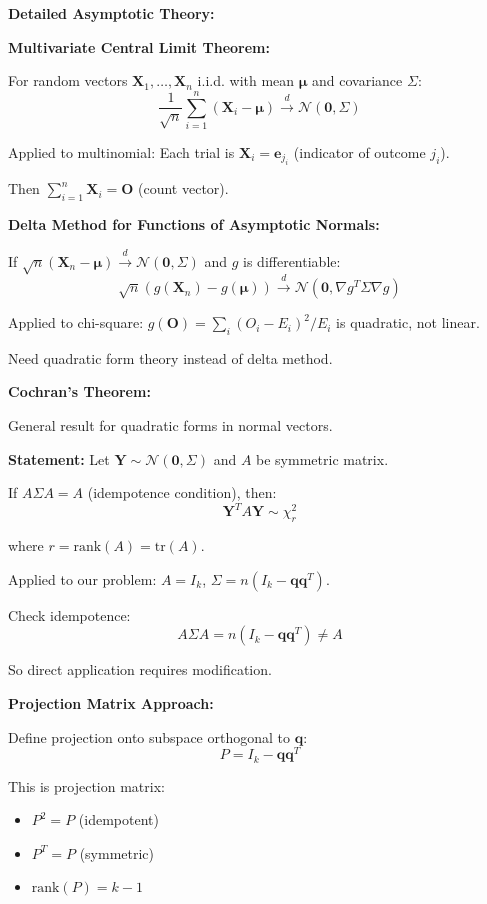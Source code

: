 \documentclass[12pt]{article}
\begin{document}
\begin{explanation}

\textbf{Detailed Asymptotic Theory:}

\textbf{Multivariate Central Limit Theorem:}

For random vectors $\mathbf{X}_1, \ldots, \mathbf{X}_n$ i.i.d. with mean $\boldsymbol{\mu}$ and covariance $\Sigma$:
\[
\frac{1}{\sqrt{n}}\sum_{i=1}^n (\mathbf{X}_i - \boldsymbol{\mu}) \xrightarrow{d} \mathcal{N}(\mathbf{0}, \Sigma)
\]

Applied to multinomial: Each trial is $\mathbf{X}_i = \mathbf{e}_{j_i}$ (indicator of outcome $j_i$).

Then $\sum_{i=1}^n \mathbf{X}_i = \mathbf{O}$ (count vector).

\textbf{Delta Method for Functions of Asymptotic Normals:}

If $\sqrt{n}(\mathbf{X}_n - \boldsymbol{\mu}) \xrightarrow{d} \mathcal{N}(\mathbf{0}, \Sigma)$ and $g$ is differentiable:
\[
\sqrt{n}(g(\mathbf{X}_n) - g(\boldsymbol{\mu})) \xrightarrow{d} \mathcal{N}\left(\mathbf{0}, \nabla g^T \Sigma \nabla g\right)
\]

Applied to chi-square: $g(\mathbf{O}) = \sum_i (O_i - E_i)^2/E_i$ is quadratic, not linear.

Need quadratic form theory instead of delta method.

\textbf{Cochran's Theorem:}

General result for quadratic forms in normal vectors.

\textbf{Statement:} Let $\mathbf{Y} \sim \mathcal{N}(\mathbf{0}, \Sigma)$ and $A$ be symmetric matrix.

If $A\Sigma A = A$ (idempotence condition), then:
\[
\mathbf{Y}^TA\mathbf{Y} \sim \chi^2_r
\]

where $r = \text{rank}(A) = \text{tr}(A)$.

Applied to our problem: $A = I_k$, $\Sigma = n(I_k - \mathbf{q}\mathbf{q}^T)$.

Check idempotence:
\[
A\Sigma A = n(I_k - \mathbf{q}\mathbf{q}^T) \neq A
\]

So direct application requires modification.

\textbf{Projection Matrix Approach:}

Define projection onto subspace orthogonal to $\mathbf{q}$:
\[
P = I_k - \mathbf{q}\mathbf{q}^T
\]

This is projection matrix:
\begin{itemize}
    \item $P^2 = P$ (idempotent)
    \item $P^T = P$ (symmetric)
    \item $\text{rank}(P) = k - 1$
\end{itemize}


\end{explanation}
\end{document}
